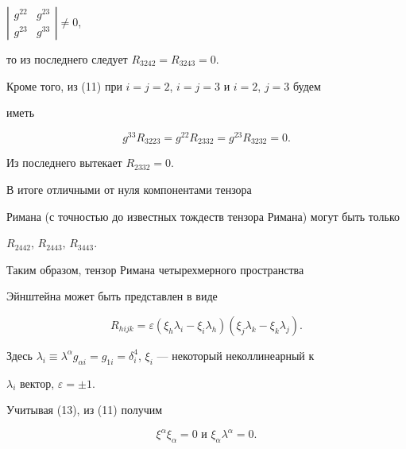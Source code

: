 $\left| 


\begin{smallmatrix}


g^{22} & g^{23} \\ g^{23} & g^{33} \end{smallmatrix}


\right| \neq 0$,


то из последнего следует $R_{3242}=R_{3243}=0$.


Кроме того, из (11) при $i=j=2$, $i=j=3$ и $i=2$, $j=3$ будем


иметь 


$$


g^{33}R_{3223}=g^{22}R_{2332}=g^{23}R_{3232}=0.


$$


Из последнего вытекает $R_{2332}=0$.





В итоге отличными от нуля компонентами тензора


Римана (с точностью до известных тождеств тензора Римана) могут быть только


$R_{2442}$, $R_{2443}$, $R_{3443}$.





Таким образом, тензор Римана четырехмерного пространства


Эйнштейна может быть представлен в виде


\begin{equation}


R_{hijk}=\varepsilon (\xi_h\lambda_i-\xi_i\lambda_h)(\xi_j\lambda_k-\xi


_k\lambda_j).


\end{equation}


Здесь $\lambda_i\equiv\lambda ^\alpha g_{\alpha i}=


g_{1i}=\delta_i^4$, $\xi_i$ --- некоторый неколлинеарный к 


$\lambda_i$ вектор, $\varepsilon=\pm1$.





Учитывая (13), из (11) получим


\begin{equation}


\xi ^\alpha \xi_\alpha =0 \text{\ \ и \ \ }


\xi_\alpha \lambda ^\alpha =0.


\end{equation}





